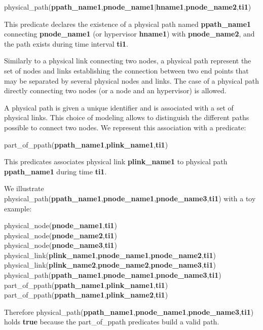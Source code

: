 physical\_path(\textbf{ppath\_name1},\textbf{pnode\_name1}$\vert$\textbf{hname1},\textbf{pnode\_name2},\textbf{ti1})

This predicate declares the existence of a physical path named \textbf{ppath\_name1} connecting \textbf{pnode\_name1} (or hypervisor \textbf{hname1}) with \textbf{pnode\_name2}, and the path exists during time interval \textbf{ti1}. 

Similarly to a physical link connecting two nodes, a physical path represent the set of nodes and links establishing the connection between two end points that may be separated by several physical nodes and links.
The case of a physical path directly connecting two nodes (or a node and an hypervisor) is allowed.

A physical path is given a unique identifier and is associated with a set of physical links. 
This choice of modeling allows to distinguish the different paths possible to connect two nodes. 
We represent this association with a predicate:

part\_of\_ppath(\textbf{ppath\_name1},\textbf{plink\_name1},\textbf{ti1})

This predicates associates physical link \textbf{plink\_name1} to physical path \textbf{ppath\_name1} during time \textbf{ti1}.

We illustrate physical\_path(\textbf{ppath\_name1},\textbf{pnode\_name1},\textbf{pnode\_name3},\textbf{ti1}) with a toy example:

physical\_node(\textbf{pnode\_name1},\textbf{ti1})\\
physical\_node(\textbf{pnode\_name2},\textbf{ti1})\\
physical\_node(\textbf{pnode\_name3},\textbf{ti1})\\
physical\_link(\textbf{plink\_name1},\textbf{pnode\_name1},\textbf{pnode\_name2},\textbf{ti1})\\
physical\_link(\textbf{plink\_name2},\textbf{pnode\_name2},\textbf{pnode\_name3},\textbf{ti1})\\
physical\_path(\textbf{ppath\_name1},\textbf{pnode\_name1},\textbf{pnode\_name3},\textbf{ti1})\\
part\_of\_ppath(\textbf{ppath\_name1},\textbf{plink\_name1},\textbf{ti1})\\
part\_of\_ppath(\textbf{ppath\_name1},\textbf{plink\_name2},\textbf{ti1})

Therefore physical\_path(\textbf{ppath\_name1},\textbf{pnode\_name1},\textbf{pnode\_name3},\textbf{ti1}) holds \textbf{true} because the part\_of\_ppath predicates build a valid path.

